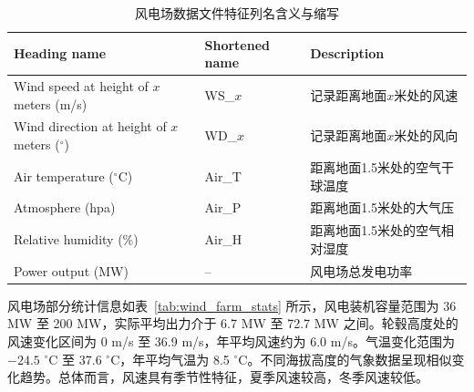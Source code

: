 \begin{table}[H]
    \centering
    \caption{风电场数据文件特征列名含义与缩写}
    \label{tab:wind_farm_features}
    \begin{tabular}{lll}
        \toprule
        \textbf{Heading name} & \textbf{Shortened name} & \textbf{Description} \\ \midrule
        Wind speed at height of $x$ meters (m/s) & WS\_$x$ & 记录距离地面$x$米处的风速 \\
        Wind direction at height of $x$ meters ($^\circ$) & WD\_$x$ & 记录距离地面$x$米处的风向 \\
        Air temperature ($^\circ$C) & Air\_T & 距离地面1.5米处的空气干球温度 \\
        Atmosphere (hpa) & Air\_P & 距离地面1.5米处的大气压 \\
        Relative humidity (\%) & Air\_H & 距离地面1.5米处的空气相对湿度 \\
        Power output (MW) & -- & 风电场总发电功率 \\
        \bottomrule
    \end{tabular}
\end{table}
风电场部分统计信息如表~\ref{tab:wind_farm_stats} 所示，风电装机容量范围为 36 MW 至 200 MW，实际平均出力介于 6.7 MW 至 72.7 MW 之间。轮毂高度处的风速变化区间为 0 m/s 至 36.9 m/s，年平均风速约为 6.0 m/s。气温变化范围为 $-24.5$ $^\circ$C 至 37.6 $^\circ$C，年平均气温为 8.5 $^\circ$C。不同海拔高度的气象数据呈现相似变化趋势。总体而言，风速具有季节性特征，夏季风速较高，冬季风速较低。

